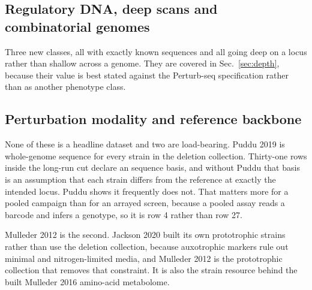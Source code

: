 \subsection{Regulatory DNA, deep scans and combinatorial genomes}

Three new classes, all with exactly known sequences and all going deep on
a locus rather than shallow across a genome. They are covered in Sec.~\ref{sec:depth},
because their value is best stated against the Perturb-seq specification rather than as
another phenotype class.

\subsection{Perturbation modality and reference backbone}

None of these is a headline dataset and two are load-bearing.
Puddu 2019 is whole-genome sequence for every strain in the deletion collection.
Thirty-one rows inside the long-run cut declare an  sequence basis, and
without Puddu that basis is an assumption that each strain differs from the reference at
exactly the intended locus. Puddu shows it frequently does not. That matters more for a
pooled campaign than for an arrayed screen, because a pooled assay reads a barcode and
infers a genotype, so it is row 4 rather than row 27.

Mulleder 2012 is the second. Jackson 2020 built its own prototrophic strains rather than
use the deletion collection, because auxotrophic markers rule out minimal and
nitrogen-limited media, and Mulleder 2012 is the prototrophic collection that removes that
constraint. It is also the strain resource behind the built Mulleder 2016 amino-acid
metabolome.
